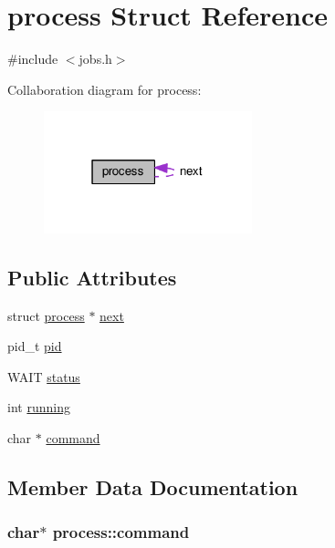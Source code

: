 \hypertarget{structprocess}{}\section{process Struct Reference}
\label{structprocess}


{\ttfamily \#include $<$jobs.\+h$>$}



Collaboration diagram for process\+:
\nopagebreak
\begin{figure}[H]
\begin{center}
\leavevmode
\includegraphics[width=171pt]{structprocess__coll__graph}
\end{center}
\end{figure}
\subsection*{Public Attributes}
\begin{DoxyCompactItemize}
\item 
struct \hyperlink{structprocess}{process} $\ast$ \hyperlink{structprocess_aa714b70ab9ca99fc489de2f70a091b0b}{next}
\item 
pid\+\_\+t \hyperlink{structprocess_ab7b330a89c9b52c5f0c7dedd4f90dfb8}{pid}
\item 
W\+A\+IT \hyperlink{structprocess_ab1cc113f2cf7e94945d01e4366ac1d0c}{status}
\item 
int \hyperlink{structprocess_ada5ec5eaed30b9d88d1cf6f2b27c3470}{running}
\item 
char $\ast$ \hyperlink{structprocess_acf66477c56add129da786ade715a6757}{command}
\end{DoxyCompactItemize}


\subsection{Member Data Documentation}
\subsubsection[{\texorpdfstring{command}{command}}]{\setlength{\rightskip}{0pt plus 5cm}char$\ast$ process\+::command}\hypertarget{structprocess_acf66477c56add129da786ade715a6757}{}\label{structprocess_acf66477c56add129da786ade715a6757}
